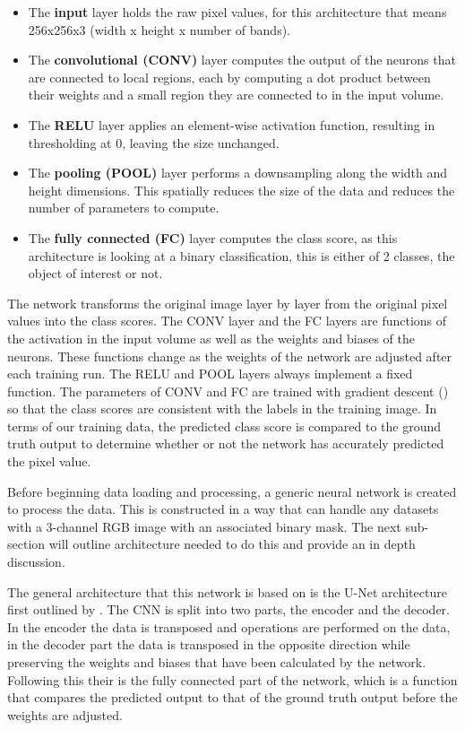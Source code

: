 \begin{itemize}
    
    \item The \textbf{input} layer holds the raw pixel values, for this architecture that means 256x256x3 (width x height x number of bands).
    \item The \textbf{convolutional (CONV)} layer computes the output of the neurons that are connected to local regions, each by computing a dot product between their weights and a small region they are connected to in the input volume.
    \item The \textbf{RELU} layer applies an element-wise activation function, resulting in thresholding at 0, leaving the size unchanged.
    \item The \textbf{pooling (POOL)} layer performs a downsampling along the width and height dimensions. This spatially reduces the size of the data and reduces the number of parameters to compute.
    \item The \textbf{fully connected (FC)} layer computes the class score, as this architecture is looking at a binary classification, this is either of 2 classes, the object of interest or not. 
\end{itemize}
\par
The network transforms the original image layer by layer from the original pixel values into the class scores. The CONV layer and the FC layers are functions of the activation in the input volume as well as the weights and biases of the neurons. These functions change as the weights of the network are adjusted after each training run. The RELU and POOL layers always implement a fixed function. The parameters of CONV and FC are trained with gradient descent (\cite{Bottou98,Sutskever13}) so that the class scores are consistent with the labels in the training image. In terms of our training data, the predicted class score is compared to the ground truth output to determine whether or not the network has accurately predicted the pixel value.
\par

Before beginning data loading and processing, a generic neural network is created to process the data. This is constructed in a way that can handle any datasets with a 3-channel RGB image with an associated binary mask. The next sub-section will outline architecture needed to do this and provide an in depth discussion. 
\par
The general architecture that this network is based on is the U-Net architecture first outlined by \citet{ronneberger15}. The CNN is split into two parts, the encoder and the decoder. In the encoder the data is transposed and operations are performed on the data, in the decoder part the data is transposed in the opposite direction while preserving the weights and biases that have been calculated by the network. Following this their is the fully connected part of the network, which is a function that compares the predicted output to that of the ground truth output before the weights are adjusted.

